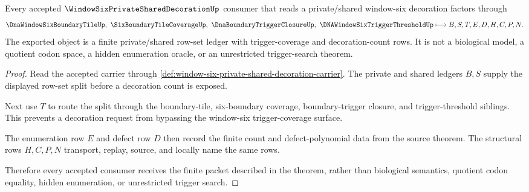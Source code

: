 \begin{theorem}\label{thm:window-six-private-shared-decoration-enumeration-handoff}
Every accepted $\WindowSixPrivateSharedDecorationUp$ consumer that reads a private/shared window-six decoration factors through
$$
\DnaWindowSixBoundaryTileUp,\ \SixBoundaryTileCoverageUp,\ \DnaBoundaryTriggerClosureUp,\ \DNAWindowSixTriggerThresholdUp
\longmapsto
B,S,T,E,D,H,C,P,N .
$$
The exported object is a finite private/shared row-set ledger with trigger-coverage and decoration-count rows. It is not a biological model, a quotient codon space, a hidden enumeration oracle, or an unrestricted trigger-search theorem.
\end{theorem}
\begin{proof}
Read the accepted carrier through \autoref{def:window-six-private-shared-decoration-carrier}. The private and shared ledgers $B,S$ supply the displayed row-set split before a decoration count is exposed.

Next use $T$ to route the split through the boundary-tile, six-boundary coverage, boundary-trigger closure, and trigger-threshold siblings. This prevents a decoration request from bypassing the window-six trigger-coverage surface.

The enumeration row $E$ and defect row $D$ then record the finite count and defect-polynomial data from the source theorem. The structural rows $H,C,P,N$ transport, replay, source, and locally name the same rows.

Therefore every accepted consumer receives the finite packet described in the theorem, rather than biological semantics, quotient codon equality, hidden enumeration, or unrestricted trigger search.
\end{proof}

